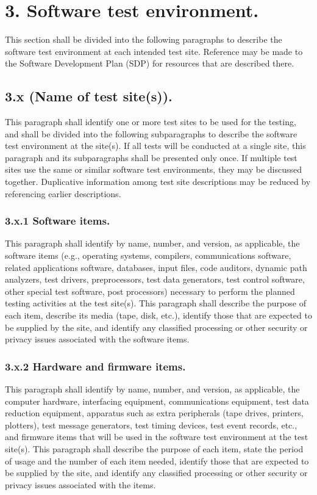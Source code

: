 \section{3. Software test environment.}

This section shall be divided into the following paragraphs to describe
the software test environment at each intended test site. Reference may
be made to the Software Development Plan (SDP) for resources that are
described there.

\subsection{3.x (Name of test site(s)).}

This paragraph shall identify one or more test sites to be used for the
testing, and shall be divided into the following subparagraphs to
describe the software test environment at the site(s). If all tests will
be conducted at a single site, this paragraph and its subparagraphs
shall be presented only once. If multiple test sites use the same or
similar software test environments, they may be discussed together.
Duplicative information among test site descriptions may be reduced by
referencing earlier descriptions.

\subsubsection{3.x.1 Software items.}

This paragraph shall identify by name, number, and version, as
applicable, the software items (e.g., operating systems, compilers,
communications software, related applications software, databases, input
files, code auditors, dynamic path analyzers, test drivers,
preprocessors, test data generators, test control software, other
special test software, post processors) necessary to perform the planned
testing activities at the test site(s). This paragraph shall describe
the purpose of each item, describe its media (tape, disk, etc.),
identify those that are expected to be supplied by the site, and
identify any classified processing or other security or privacy issues
associated with the software items.

\subsubsection{3.x.2 Hardware and firmware items.}

This paragraph shall identify by name, number, and version, as
applicable, the computer hardware, interfacing equipment, communications
equipment, test data reduction equipment, apparatus such as extra
peripherals (tape drives, printers, plotters), test message generators,
test timing devices, test event records, etc., and firmware items that
will be used in the software test environment at the test site(s). This
paragraph shall describe the purpose of each item, state the period of
usage and the number of each item needed, identify those that are
expected to be supplied by the site, and identify any classified
processing or other security or privacy issues associated with the
items.

